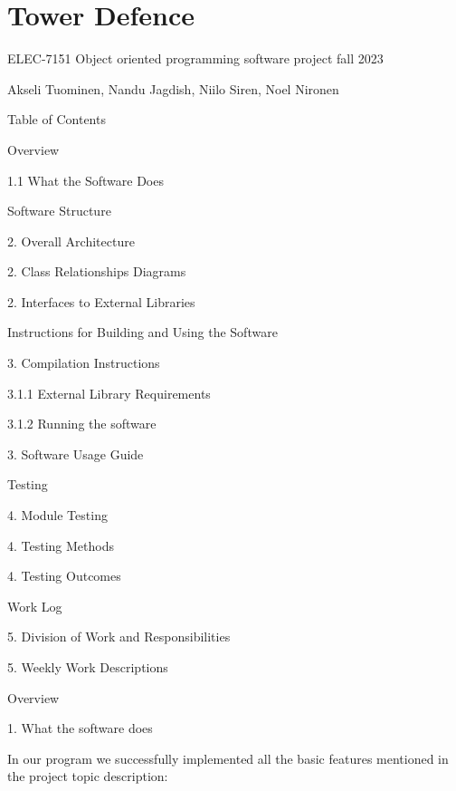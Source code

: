 \chapter{Tower Defence}
\hypertarget{index}{}\label{index}
\label{index_md__r_e_a_d_m_e}%
%
 ELEC-\/7151 Object oriented programming software project fall 2023

Akseli Tuominen, Nandu Jagdish, Niilo Siren, Noel Nironen

Table of Contents


\begin{DoxyEnumerate}
\item Overview \begin{DoxyVerb} 1.1 What the Software Does 
\end{DoxyVerb}

\item Software Structure

2. Overall Architecture

2. Class Relationships Diagrams

2. Interfaces to External Libraries
\item Instructions for Building and Using the Software

3. Compilation Instructions \begin{DoxyVerb}3.1.1 External Library Requirements 

3.1.2 Running the software 
\end{DoxyVerb}
 3. Software Usage Guide
\item Testing

4. Module Testing

4. Testing Methods

4. Testing Outcomes
\item Work Log

5. Division of Work and Responsibilities

5. Weekly Work Descriptions
\end{DoxyEnumerate}

Overview

1. What the software does

In our program we successfully implemented all the basic features mentioned in the project topic description\+:


